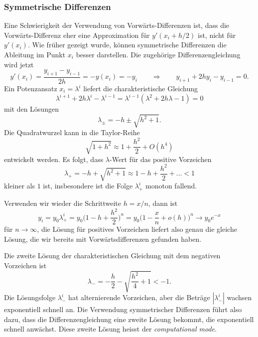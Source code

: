 \subsubsection{Symmetrische Differenzen}
Eine Schwierigkeit der Verwendung von Vorwärts-Differenzen ist, dass
die Vorwärts-Differenz eher eine Approximation für $y'(x_i+h/2)$ ist,
nicht für $y'(x_i)$.
Wie früher gezeigt wurde, können symmetrische Differenzen die Ableitung
im Punkt $x_i$ besser darstellen.
Die zugehörige Differenzengleichung wird jetzt
\[
y'(x_i)
=
\frac{y_{i+1}-y_{i-1}}{2h}
=
-y(x_i)
=
-y_i
\qquad\Rightarrow\qquad
y_{i+1}+2hy_i-y_{i-1}=0.
\]
Ein Potenzansatz $x_i=\lambda^i$ liefert die charakteristische Gleichung
\[
\lambda^{i+1} +2h\lambda^i -\lambda^{i-1}
=
\lambda^{i-1}(\lambda^2 + 2h\lambda -1)
=
0
\]
mit den Lösungen
\[
\lambda_\pm = -h \pm \sqrt{h^2+1}.
\]
Die Quadratwurzel kann in die Taylor-Reihe
%
%
\[
\sqrt{1+h^2}
\approx
1 + \frac{h^2}2 + O(h^4)
\]
entwickelt werden.
Es folgt, dass $\lambda$-Wert für das positive Vorzeichen
\[
\lambda_+
=
-h+\sqrt{h^2+1}
\approx
1-h+\frac{h^2}{2}+\dots
<
1
\]
kleiner als $1$ ist, insbesondere ist die Folge $\lambda_+^i$ monoton fallend.

Verwenden wir wieder die Schrittweite $h=x/n$, dann ist
\[
y_i
=
y_0 \lambda_+^i
=
y_0 \biggl(1-h+\frac{h^2}2\biggr)^n
=
y_0\biggl(1-\frac{x}n + o(h)\biggr)^n
\to
y_0e^{-x}
\]
für $n\to\infty$, die Lösung für positives Vorzeichen liefert also genau
die gleiche Lösung, die wir bereits mit Vorwärtsdifferenzen gefunden haben.

Die zweite Lösung der charakteristischen Gleichung mit dem negativen
Vorzeichen ist
\[
\lambda_-
=
-\frac{h}2 - \sqrt{\frac{h^2}{4}+1}
<
-1.
\]
Die Lösungsfolge $\lambda_-^i$ hat alternierende Vorzeichen, aber die 
Beträge $|\lambda_-^i|$ wachsen exponentiell schnell an.
Die Verwendung symmetrischer Differenzen führt also dazu, dass die
Differenzengleichung eine zweite Lösung bekommt, die exponentiell
schnell anwächst.
Diese zweite Lösung heisst der {\em computational mode}.


